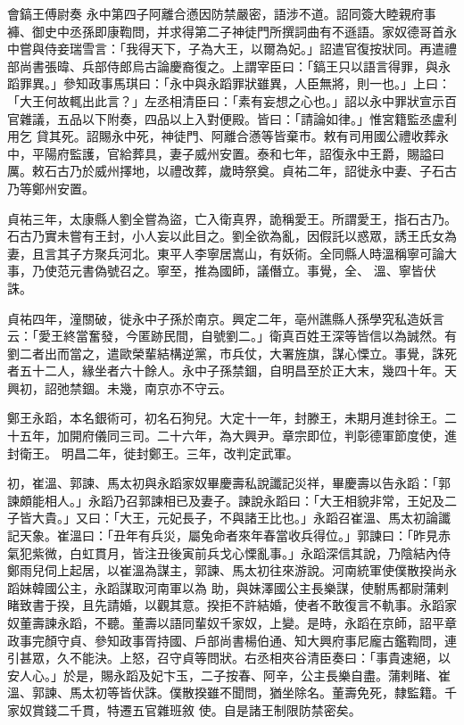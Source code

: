 \begin{pinyinscope}
 會鎬王傅尉奏
 永中第四子阿離合懣因防禁嚴密，語涉不道。詔同簽大睦親府事褲、御史中丞孫即康鞫問，并求得第二子神徒門所撰詞曲有不遜語。家奴德哥首永中嘗與侍妾瑞雪言：「我得天下，子為大王，以爾為妃。」詔遣官復按狀同。再遣禮部尚書張暐、兵部侍郎烏古論慶裔復之。上謂宰臣曰：「鎬王只以語言得罪，與永蹈罪異。」參知政事馬琪曰：「永中與永蹈罪狀雖異，人臣無將，則一也。」上曰：「大王何故輒出此言？」左丞相清臣曰：「素有妄想之心也。」詔以永中罪狀宣示百官雜議，五品以下附奏，四品以上入對便殿。皆曰：「請論如律。」惟宮籍監丞盧利用乞
 貸其死。詔賜永中死，神徒門、阿離合懣等皆棄市。敕有司用國公禮收葬永中，平陽府監護，官給葬具，妻子威州安置。泰和七年，詔復永中王爵，賜謚曰厲。敕石古乃於威州擇地，以禮改葬，歲時祭奠。貞祐二年，詔徙永中妻、子石古乃等鄭州安置。



 貞祐三年，太康縣人劉全嘗為盜，亡入衛真界，詭稱愛王。所謂愛王，指石古乃。石古乃實未嘗有王封，小人妄以此目之。劉全欲為亂，因假託以惑眾，誘王氏女為妻，且言其子方聚兵河北。東平人李寧居嵩山，有妖術。全同縣人時溫稱寧可論大事，乃使范元書偽號召之。寧至，推為國師，議僭立。事覺，全、
 溫、寧皆伏誅。



 貞祐四年，潼關破，徙永中子孫於南京。興定二年，亳州譙縣人孫學究私造妖言云：「愛王終當奮發，今匿跡民間，自號劉二。」衛真百姓王深等皆信以為誠然。有劉二者出而當之，遣歐榮輩結構逆黨，市兵仗，大署旌旗，謀心慄立。事覺，誅死者五十二人，緣坐者六十餘人。永中子孫禁錮，自明昌至於正大末，幾四十年。天興初，詔弛禁錮。未幾，南京亦不守云。



 鄭王永蹈，本名銀術可，初名石狗兒。大定十一年，封滕王，未期月進封徐王。二十五年，加開府儀同三司。二十六年，為大興尹。章宗即位，判彰德軍節度使，進封衛王。
 明昌二年，徙封鄭王。三年，改判定武軍。



 初，崔溫、郭諫、馬太初與永蹈家奴畢慶壽私說讖記災祥，畢慶壽以告永蹈：「郭諫頗能相人。」永蹈乃召郭諫相已及妻子。諫說永蹈曰：「大王相貌非常，王妃及二子皆大貴。」又曰：「大王，元妃長子，不與諸王比也。」永蹈召崔溫、馬太初論讖記天象。崔溫曰：「丑年有兵災，屬兔命者來年春當收兵得位。」郭諫曰：「昨見赤氣犯紫微，白虹貫月，皆注丑後寅前兵戈心慄亂事。」永蹈深信其說，乃陰結內侍鄭雨兒伺上起居，以崔溫為謀主，郭諫、馬太初往來游說。河南統軍使僕散揆尚永蹈妹韓國公主，永蹈謀取河南軍以為
 助，與妹澤國公主長樂謀，使駙馬都尉蒲剌睹致書于揆，且先請婚，以觀其意。揆拒不許結婚，使者不敢復言不軌事。永蹈家奴董壽諫永蹈，不聽。董壽以語同輩奴千家奴，上變。是時，永蹈在京師，詔平章政事完顏守貞、參知政事胥持國、戶部尚書楊伯通、知大興府事尼龐古鑑鞫問，連引甚眾，久不能決。上怒，召守貞等問狀。右丞相夾谷清臣奏曰：「事貴速絕，以安人心。」於是，賜永蹈及妃卞玉，二子按春、阿辛，公主長樂自盡。蒲剌睹、崔溫、郭諫、馬太初等皆伏誅。僕散揆雖不聞問，猶坐除名。董壽免死，隸監籍。千家奴賞錢二千貫，特遷五官雜班敘
 使。自是諸王制限防禁密矣。




\end{pinyinscope}
